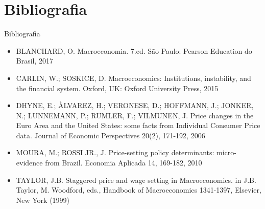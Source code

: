 \documentclass[10pt]{beamer}
\begin{document}
\section{Bibliografia}
\begin{frame}{ Bibliografia}
    \begin{itemize}                
        \item BLANCHARD, O. Macroeconomia. 7.ed. São Paulo: Pearson Education do Brasil, 2017\medskip                
        \item CARLIN, W.; SOSKICE, D. Macroeconomics: Institutions, instability, and the financial system. Oxford, UK: Oxford University Press, 2015\medskip        
        \item DHYNE, E.; ÀLVAREZ, H.; VERONESE, D.; HOFFMANN, J.; JONKER, N.; LUNNEMANN, P.; RUMLER, F.; VILMUNEN, J. Price changes in the Euro Area and the United States: some facts from Individual Consumer Price data. Journal of Economic Perspectives 20(2), 171-192, 2006\medskip
        \item MOURA, M.; ROSSI JR., J. Price-setting policy determinants: micro-evidence from Brazil. Economia Aplicada 14, 169-182, 2010\medskip
        \item TAYLOR, J.B. Staggered price and wage setting in Macroeconomics. in J.B. Taylor, M. Woodford, eds., Handbook of Macroeconomics 1341-1397, Elsevier, New York (1999)         
    \end{itemize}
\end{frame}
\end{document}
